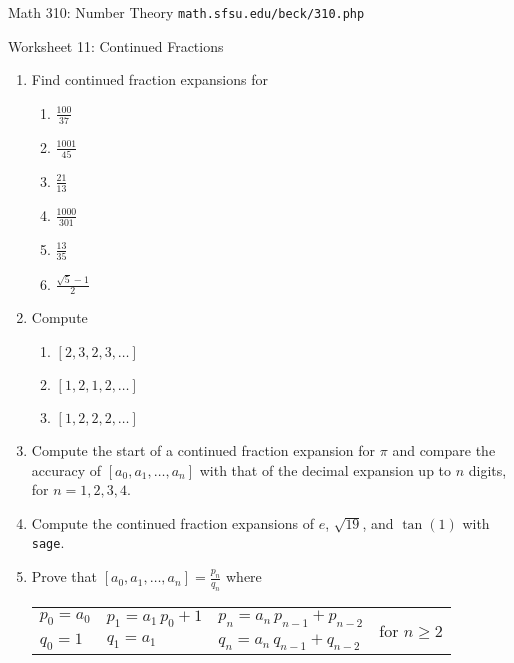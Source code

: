 \documentclass[11pt]{article}
\def\sage{{\tt sage}}
\begin{document}
\setlength{\parindent}{0pt}
\setlength{\parskip}{0.2cm}

{ Math 310: Number Theory}
\hfill
{\tt math.sfsu.edu/beck/310.php}

\vspace{.3in}

\begin{center}
\Large{Worksheet 11: Continued Fractions}
\end{center}

\begin{enumerate}

\item Find continued fraction expansions for
  \begin{multicols}{3}
  \begin{enumerate}
  \item $\frac{ 100 }{ 37 }$
  \item $\frac{ 1001 }{ 45 }$
  \item $\frac{ 21 }{ 13 }$
  \item $\frac{ 1000 }{ 301 }$
  \item $\frac{ 13 }{ 35 }$
  \item $\frac{ \sqrt 5 - 1 }{ 2 }$
  \end{enumerate}
  \end{multicols}

\item Compute
  \begin{multicols}{3}
  \begin{enumerate}
  \item $[2,3,2,3, \dots]$
  \item $[1,2,1,2, \dots]$
  \item $[1,2,2,2, \dots]$
  \end{enumerate}
  \end{multicols}

\item Compute the start of a continued fraction expansion for $\pi$ and compare the accuracy of $[a_0, a_1,
\dots, a_n]$ with that of the decimal expansion up to $n$ digits, for $n = 1, 2, 3, 4$.

\item Compute the continued fraction expansions of $e$, $\sqrt{19}$, and $\tan(1)$ with \sage.

\item\label{two} Prove that $[a_0, a_1, \dots, a_n] = \frac{ p_n }{ q_n }$ where

  \begin{tabular}{llll}
    $p_0 = a_0$ \hspace{1cm} & $p_1 = a_1 \, p_0 + 1$ \hspace{1cm} & $p_n = a_n \, p_{ n-1 } + p_{ n-2 }$ & \multirow{2}{*}{for $n \ge 2$} \\
    $q_0 = 1$                & $q_1 = a_1$                         & $q_n = a_n \, q_{ n-1 } + q_{ n-2 }$ 
  \end{tabular}


\end{enumerate}
\end{document}
